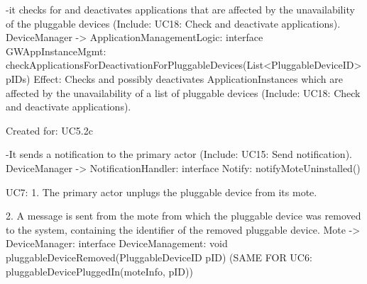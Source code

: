             -it checks for and deactivates applications that are affected by the unavailability of the pluggable devices (Include: UC18: Check and deactivate applications).
                DeviceManager -> ApplicationManagementLogic: interface GWAppInstanceMgmt: checkApplicationsForDeactivationForPluggableDevices(List<PluggableDeviceID> pIDs)
                    Effect: Checks and possibly deactivates ApplicationInstances which are affected by the unavailability of a list of pluggable devices (Include: UC18: Check and deactivate applications).
                    \item Created for: UC5.2c

            -It sends a notification to the primary actor (Include: UC15: Send notification).
                DeviceManager -> NotificationHandler: interface Notify: notifyMoteUninstalled()


    UC7:
        1. The primary actor unplugs the pluggable device from its mote.

        2. A message is sent from the mote from which the pluggable device was removed to the system,
           containing the identifier of the removed pluggable device.
            Mote -> DeviceManager: interface DeviceManagement: void pluggableDeviceRemoved(PluggableDeviceID pID)
            (SAME FOR UC6: pluggableDevicePluggedIn(moteInfo, pID))

